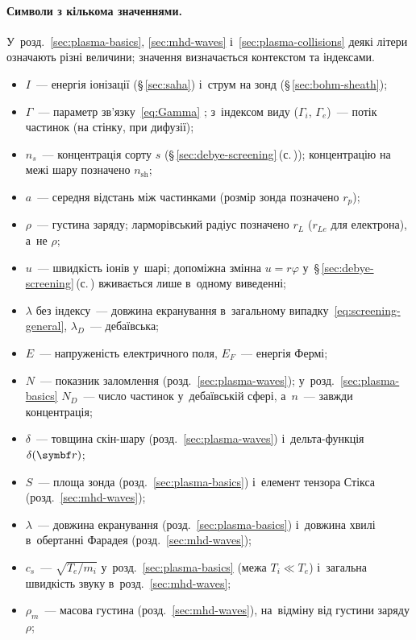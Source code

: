 \paragraph{Символи з кількома значеннями.} У~розд.~\ref{sec:plasma-basics}, \ref{sec:mhd-waves} і~\ref{sec:plasma-collisions} деякі літери означають різні величини;
значення визначається контекстом та індексами.
\begin{itemize}
	\item $I$~--- енергія іонізації (\S\,\ref{sec:saha}) і~струм на зонд (\S\,\ref{sec:bohm-sheath});
	\item $\Gamma$~--- параметр зв'язку~\eqref{eq:Gamma} ; з~індексом виду ($\Gamma_i$, $\Gamma_e$)~--- потік частинок (на стінку, при дифузії);
	\item $n_s$~--- концентрація сорту $s$ (§\,\ref{sec:debye-screening}\,(с.\,\pageref{sec:debye-screening})); концентрацію на межі шару позначено $n_\mathrm{sh}$;
	\item $a$~--- середня відстань між частинками (розмір зонда позначено $r_p$);
	\item $\rho$~--- густина заряду; ларморівський радіус позначено $r_{L}$ ($r_{Le}$ для електрона), а~не $\rho$;
	\item $u$~--- швидкість іонів у~шарі; допоміжна змінна $u=r\varphi$ у~§\,\ref{sec:debye-screening}\,(с.\,\pageref{sec:debye-screening}) вживається лише в~одному виведенні;
	\item $\lambda$ без індексу~--- довжина екранування в~загальному випадку~\eqref{eq:screening-general}, $\lambda_D$~--- дебаївська;
	\item $E$~--- напруженість електричного поля, $E_F$~--- енергія Фермі;
	\item $N$~--- показник заломлення (розд.~\ref{sec:plasma-waves}); у~розд.~\ref{sec:plasma-basics} $N_D$~--- число частинок у~дебаївській сфері, а~$n$~--- завжди концентрація;
	\item $\delta$~--- товщина скін-шару (розд.~\ref{sec:plasma-waves}) і~дельта-функція $\delta(\vect r)$;
	\item $S$~--- площа зонда (розд.~\ref{sec:plasma-basics}) і~елемент тензора Стікса (розд.~\ref{sec:mhd-waves});
	\item $\lambda$~--- довжина екранування (розд.~\ref{sec:plasma-basics}) і~довжина хвилі в~обертанні Фарадея (розд.~\ref{sec:mhd-waves});
	\item $c_s$~--- $\sqrt{T_e/m_i}$ у~розд.~\ref{sec:plasma-basics} (межа $T_i\ll T_e$) і~загальна швидкість звуку в~розд.~\ref{sec:mhd-waves};
	\item $\rho_m$~--- масова густина (розд.~\ref{sec:mhd-waves}), на~відміну від густини заряду $\rho$;

\end{itemize}
